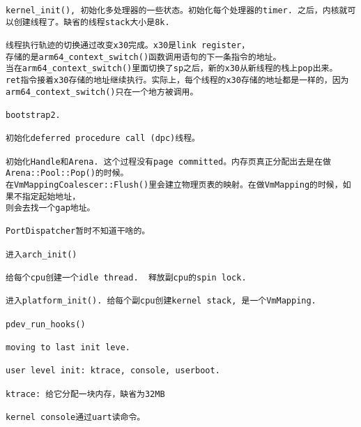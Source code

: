 \begin{verbatim}
kernel_init(), 初始化多处理器的一些状态。初始化每个处理器的timer. 之后，内核就可以创建线程了。缺省的线程stack大小是8k.

线程执行轨迹的切换通过改变x30完成。x30是link register，
存储的是arm64_context_switch()函数调用语句的下一条指令的地址。
当在arm64_context_switch()里面切换了sp之后，新的x30从新线程的栈上pop出来。
ret指令接着x30存储的地址继续执行。实际上，每个线程的x30存储的地址都是一样的，因为
arm64_context_switch()只在一个地方被调用。

bootstrap2.

初始化deferred procedure call (dpc)线程。

初始化Handle和Arena. 这个过程没有page committed。内存页真正分配出去是在做Arena::Pool::Pop()的时候。
在VmMappingCoalescer::Flush()里会建立物理页表的映射。在做VmMapping的时候，如果不指定起始地址，
则会去找一个gap地址。

PortDispatcher暂时不知道干啥的。

进入arch_init()

给每个cpu创建一个idle thread.  释放副cpu的spin lock.

进入platform_init(). 给每个副cpu创建kernel stack, 是一个VmMapping.

pdev_run_hooks()

moving to last init leve.

user level init: ktrace, console, userboot.

ktrace: 给它分配一块内存，缺省为32MB

kernel console通过uart读命令。

\end{verbatim}













